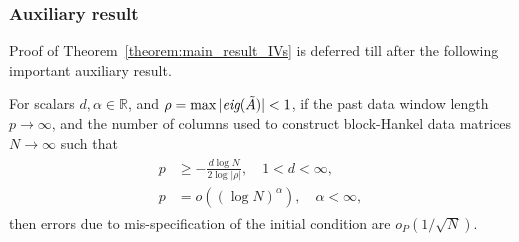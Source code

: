 \subsubsection{Auxiliary result}
Proof of Theorem~\ref{theorem:main_result_IVs} is deferred till after the following important auxiliary result.
\setcounter{thm}{0}
\begin{lem}\label{lem:relative_rates}\citep{Chiuso2006}
    For scalars $d,\alpha\in\mathbb{R}$, and ${\rho=\max|\emph{eig}(\tilde{A})|<1}$, if the past data window length ${p\rightarrow\infty}$, and the number of columns used to construct block-Hankel data matrices $N\rightarrow\infty$ such that%
    \begin{align}\label{eq:relative_rates}
        \begin{split}
            p &\geq -\frac{d\log N}{2\log|\rho|}, \quad 1 < d < \infty,\\
            p&=o((\log N)^\alpha), \quad \alpha < \infty,%
        \end{split}
    \end{align}
    then errors due to mis-specification of the initial condition are $o_P(1/\sqrt{N})$.
\end{lem}

